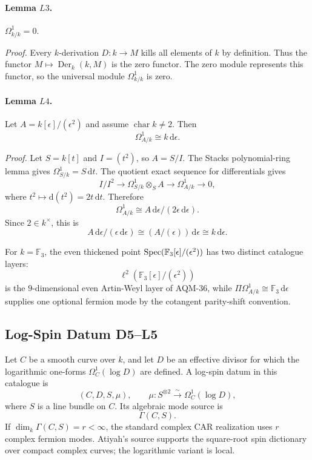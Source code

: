 \paragraph{Lemma \(L3\).}
\(\Omega^1_{k/k}=0\).

\emph{Proof.}
Every \(k\)-derivation \(D:k\to M\) kills all elements of \(k\) by definition.
Thus the functor \(M\mapsto\operatorname{Der}_k(k,M)\) is the zero functor.
The zero module represents this functor, so the universal module
\(\Omega^1_{k/k}\) is zero.

\paragraph{Lemma \(L4\).}
Let \(A=k[\epsilon]/(\epsilon^2)\) and assume \(\operatorname{char}k\ne2\).
Then
\[
  \Omega^1_{A/k}\cong k\,\mathrm d\epsilon .
\]

\emph{Proof.}
Let \(S=k[t]\) and \(I=(t^2)\), so \(A=S/I\).  The Stacks polynomial-ring
lemma gives \(\Omega^1_{S/k}=S\,\mathrm dt\).  The quotient exact sequence for
differentials gives
\[
  I/I^2\longrightarrow \Omega^1_{S/k}\otimes_S A
  \longrightarrow \Omega^1_{A/k}\longrightarrow0,
\]
where \(t^2\mapsto \mathrm d(t^2)=2t\,\mathrm dt\).  Therefore
\[
  \Omega^1_{A/k}\cong A\,\mathrm d\epsilon/(2\epsilon\,\mathrm d\epsilon).
\]
Since \(2\in k^\times\), this is
\[
  A\,\mathrm d\epsilon/(\epsilon\,\mathrm d\epsilon)\cong (A/(\epsilon))\,
  \mathrm d\epsilon\cong k\,\mathrm d\epsilon .
\]

For \(k=\mathbb F_3\), the even thickened point
\(\operatorname{Spec}(\mathbb F_3[\epsilon]/(\epsilon^2))\) has two distinct catalogue
layers:
\[
  \ell^2(\mathbb F_3[\epsilon]/(\epsilon^2))
\]
is the \(9\)-dimensional even Artin-Weyl layer of AQM-36, while
\(\Pi\Omega^1_{A/k}\cong\mathbb F_3\,\mathrm d\epsilon\) supplies one optional
fermion mode by the cotangent parity-shift convention.

\subsection{Log-Spin Datum D5--L5}
Let \(C\) be a smooth curve over \(k\), and let \(D\) be an effective divisor
for which the logarithmic one-forms \(\Omega^1_C(\log D)\) are defined.  A
log-spin datum in this catalogue is
\[
  (C,D,S,\mu),\qquad
  \mu:S^{\otimes2}\xrightarrow{\sim}\Omega^1_C(\log D),
\]
where \(S\) is a line bundle on \(C\).  Its algebraic mode source is
\[
  \Gamma(C,S).
\]
If \(\dim_k\Gamma(C,S)=r<\infty\), the standard complex CAR realization uses
\(r\) complex fermion modes.  Atiyah's source supports the square-root spin
dictionary over compact complex curves; the logarithmic variant is local.

